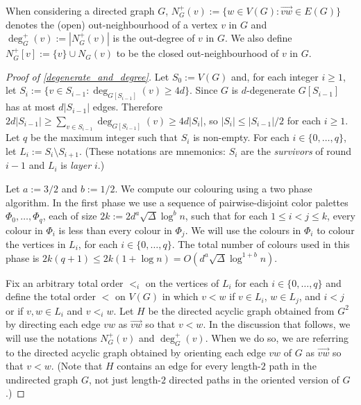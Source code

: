 \documentclass{patmorin}
\newcommand{\defin}[1]{\emph{\color{brightmaroon}#1}}
\begin{document}
When considering a directed graph $G$, $N^+_{G}(v):=\{w\in V(G):\overrightarrow{vw}\in E(G)\}$ denotes the (open) out-neighbourhood of a vertex $v$ in $G$ and $\deg^+_{G}(v):=|N^+_G(v)|$ is the out-degree of $v$ in $G$.  We also define $N^+_{G}[v]:=\{v\}\cup N_{G}(v)$ to be the closed out-neighbourhood of $v$ in $G$.

\begin{proof}[Proof of \cref{degenerate_and_degree}]
  Let $S_0:=V(G)$ and, for each integer $i\ge 1$, let $S_i:=\{v\in S_{i-1}:\deg_{G[S_{i-1}]}(v)\ge 4d\}$.  Since $G$ is $d$-degenerate $G[S_{i-1}]$ has at most $d|S_{i-1}|$ edges.  Therefore $2d|S_{i-1}|\ge \sum_{v\in S_{i-1}} \deg_{G[S_{i-1}]}(v)\ge 4d|S_i|$, so $|S_i|\le |S_{i-1}|/2$ for each $i\ge 1$.  Let $q$ be the maximum integer such that $S_i$ is non-empty.  For each $i\in\{0,\ldots,q\}$, let $L_i:=S_i\setminus S_{i+1}$.  (These notations are mnemonics: $S_i$ are the \defin{survivors} of round $i-1$ and $L_i$ is \defin{layer} $i$.)

  Let $a:=3/2$ and $b:=1/2$.
  We compute our colouring using a two phase algorithm. In the first phase we use a sequence of pairwise-disjoint color palettes $\Phi_0,\ldots,\Phi_{q}$, each of size $2k:=2d^{a}\sqrt{\Delta}\log^{b}n$, such that for each $1\le i < j\le k$, every colour in $\Phi_i$ is less than every colour in $\Phi_j$.  We will use the colours in $\Phi_i$ to colour the vertices in $L_i$, for each $i\in\{0,\ldots,q\}$.  The total number of colours used in this phase is $2k(q+1)\le 2k(1+\log n)=O(d^{a}\sqrt{\Delta}\log^{1+b}n)$.


  Fix an arbitrary total order $<_i$ on the vertices of $L_i$ for each $i\in\{0,\ldots,q\}$ and define the total order $<$ on $V(G)$ in which $v <w$ if $v\in L_i$, $w\in L_j$, and $i<j$ or if $v,w\in L_i$ and $v<_iw$. Let $H$ be the directed acyclic graph obtained from $G^2$ by directing each edge $vw$ as $\overrightarrow{vw}$ so that $v<w$.  In the discussion that follows, we will use the notations $N^+_G(v)$ and $\deg^+_G(v)$.  When we do so, we are referring to the directed acyclic graph obtained by orienting each edge $vw$ of $G$ as $\overrightarrow{vw}$ so that $v<w$.  (Note that $H$ contains an edge for every length-$2$ path in the undirected graph $G$, not just length-$2$ directed paths in the oriented version of $G$.)


\end{proof}
\end{document}
